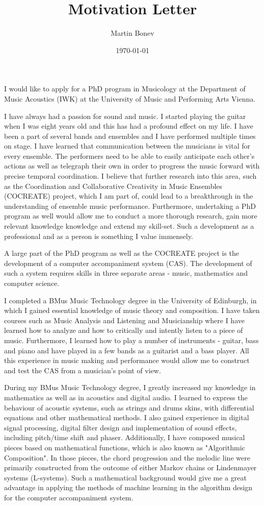 \documentclass[12pt]{scrartcl}
\title{Motivation Letter} %
\author{Martin Bonev}
\date{\today}
\begin{document}
\maketitle

I would like to apply for a PhD program in Musicology at the Department of Music Acoustics (IWK) at the University of Music and Performing Arts Vienna.

I have always had a passion for sound and music. I started playing the guitar when I was eight years old and this has had a profound effect on my life. I have been a part of several bands and ensembles and I have performed multiple times on stage.  I have learned that communication between the musicians is vital for every ensemble. The performers need to be able to easily anticipate each other's actions as well as telegraph their own in order to progress the music forward with precise temporal coordination. I believe that further research into this area, such as the Coordination and Collaborative Creativity in Music Ensembles (COCREATE) project, which I am part of, could lead to a breakthrough in the understanding of ensemble music performance. Furthermore, undertaking a PhD program as well would allow me to conduct a more thorough research, gain more relevant knowledge knowledge and extend my skill-set. Such a development as a professional and as a person is something I value immensely. 

A large part of the PhD program as well as the COCREATE project is the development of a computer accompaniment system (CAS). The development of such a system requires skills in three separate areas - music, mathematics and computer science.

I completed a BMus Music Technology degree in the University of Edinburgh, in which I gained essential knowledge of music theory and composition. I have taken courses such as Music Analysis and Listening and Musicianship where I have learned how to analyze and how to critically and intently listen to a piece of music. Furthermore, I learned how to play a number of instruments - guitar, bass and piano and have played in a few bands as a guitarist and a bass player. All this experience in music making and performance would allow me to construct and test the CAS from a musician's point of view.

During my BMus Music Technology degree, I greatly increased my knowledge in mathematics as well as in acoustics and digital audio. I learned to express the behaviour of acoustic systems, such as strings and drums skins, with differential equations and other mathematical methods. I also gained experience in digital signal processing, digital filter design and implementation of sound effects, including pitch/time shift and phaser. Additionally, I have composed musical pieces based on mathematical functions, which is also known as "Algorithmic Composition". In those pieces, the chord progression and the melodic line were primarily constructed from the outcome of either Markov chains or Lindenmayer systems (L-systems). Such a mathematical background would give me a great advantage in applying the methods of machine learning in the algorithm design for the computer accompaniment system.
\end{document}
